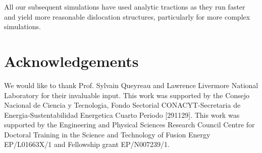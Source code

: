 \documentclass[11pt]{iopart}
\begin{document}

All our subsequent simulations have used analytic tractions as they run faster and yield more reasonable dislocation structures, particularly for more complex simulations.

\section{Acknowledgements}

We would like to thank Prof. Sylvain Queyreau and Lawrence Livermore National Laboratory for their invaluable input. This work was supported by the Consejo Nacional de Ciencia y Tecnologia, Fondo Sectorial CONACYT-Secretaria de Energia-Sustentabilidad Energetica Cuarto Periodo [291129]. This work was supported by the Engineering and Physical Sciences Research Council Centre for Doctoral Training in the Science and Technology of Fusion Energy EP/L01663X/1 and Fellowship grant EP/N007239/1.

\newcommand{\newblock}{}








\end{document}

